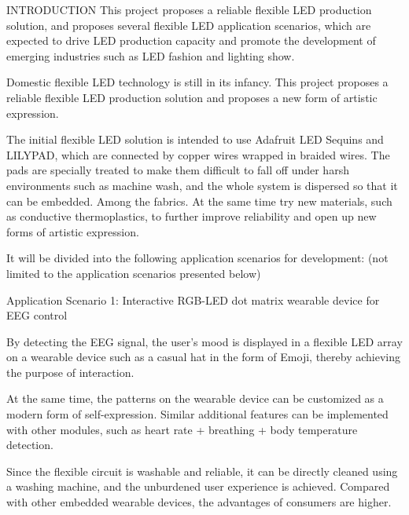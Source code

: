 \documentclass[final]{beamer}
\begin{document}
\begin{frame}[t, fragile = singleslide]{}
\begin{columns}[t]
\begin{column}{0.02\textwidth}
\end{column}

\end{columns}

\begin{columns}[t]

\begin{column}{0.45\textwidth}

\begin{block}{INTRODUCTION}
This project proposes a reliable flexible LED production solution, and proposes several flexible LED application scenarios, which are expected to drive LED production capacity and promote the development of emerging industries such as LED fashion and lighting show.

Domestic flexible LED technology is still in its infancy. This project proposes a reliable flexible LED production solution and proposes a new form of artistic expression.

The initial flexible LED solution is intended to use Adafruit LED Sequins and LILYPAD, which are connected by copper wires wrapped in braided wires. The pads are specially treated to make them difficult to fall off under harsh environments such as machine wash, and the whole system is dispersed so that it can be embedded. Among the fabrics. At the same time try new materials, such as conductive thermoplastics, to further improve reliability and open up new forms of artistic expression.

It will be divided into the following application scenarios for development: (not limited to the application scenarios presented below)

Application Scenario 1: Interactive RGB-LED dot matrix wearable device for EEG control 

By detecting the EEG signal, the user's mood is displayed in a flexible LED array on a wearable device such as a casual hat in the form of Emoji, thereby achieving the purpose of interaction.

At the same time, the patterns on the wearable device can be customized as a modern form of self-expression. Similar additional features can be implemented with other modules, such as heart rate + breathing + body temperature detection.

Since the flexible circuit is washable and reliable, it can be directly cleaned using a washing machine, and the unburdened user experience is achieved. Compared with other embedded wearable devices, the advantages of consumers are higher.


\end{block}
\end{column}
\end{columns}
\end{frame}
\end{document}

